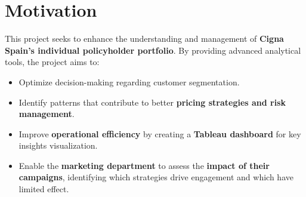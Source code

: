 \section{Motivation}

This project seeks to enhance the understanding and 
management of \textbf{Cigna Spain’s individual policyholder 
portfolio}. By providing advanced analytical tools, the 
project aims to:

\begin{itemize}
    \item Optimize decision-making regarding customer 
          segmentation.
    \item Identify patterns that contribute to better 
          \textbf{pricing strategies and risk management}.
    \item Improve \textbf{operational efficiency} by creating 
          a \textbf{Tableau dashboard} for key insights 
          visualization.
    \item Enable the \textbf{marketing department} to assess 
          the \textbf{impact of their campaigns}, identifying 
          which strategies drive engagement and which have 
          limited effect.
\end{itemize}